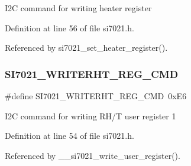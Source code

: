 I2C command for writing heater register 

Definition at line 56 of file si7021.\+h.



Referenced by si7021\+\_\+set\+\_\+heater\+\_\+register().

\mbox{\label{group__SI7021__I2C__CMD_gaec66f83a736566c680c195cad9f7cb7c}} 
\subsubsection{\texorpdfstring{S\+I7021\+\_\+\+W\+R\+I\+T\+E\+R\+H\+T\+\_\+\+R\+E\+G\+\_\+\+C\+MD}{SI7021\_WRITERHT\_REG\_CMD}}
{\footnotesize\ttfamily \#define S\+I7021\+\_\+\+W\+R\+I\+T\+E\+R\+H\+T\+\_\+\+R\+E\+G\+\_\+\+C\+MD~0x\+E6}

I2C command for writing R\+H/T user register 1 

Definition at line 54 of file si7021.\+h.



Referenced by \+\_\+\+\_\+si7021\+\_\+write\+\_\+user\+\_\+register().

